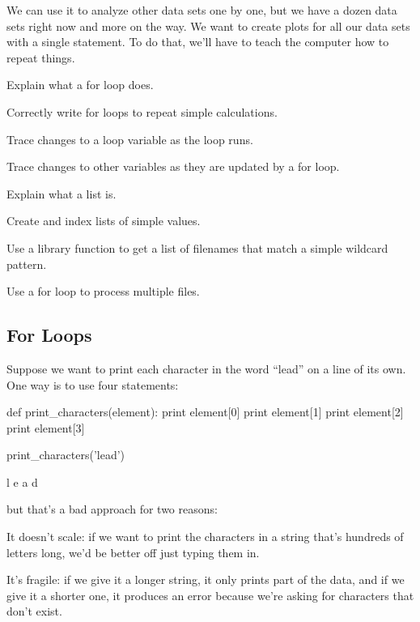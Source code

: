 We can use it to analyze other data sets one by one,
but we have a dozen data sets right now and more on the way. We want to
create plots for all our data sets with a single statement. To do that,
we'll have to teach the computer how to repeat things.

\begin{objectives}
\begin{swcitemize}
\item
  Explain what a for loop does.
\item
  Correctly write for loops to repeat simple calculations.
\item
  Trace changes to a loop variable as the loop runs.
\item
  Trace changes to other variables as they are updated by a for loop.
\item
  Explain what a list is.
\item
  Create and index lists of simple values.
\item
  Use a library function to get a list of filenames that match a simple
  wildcard pattern.
\item
  Use a for loop to process multiple files.
\end{swcitemize}
\end{objectives}

\subsection{For Loops}

Suppose we want to print each character in the word ``lead'' on a line
of its own. One way is to use four  statements:

\begin{VerbIn}
def print_characters(element):
    print element[0]
    print element[1]
    print element[2]
    print element[3]

print_characters('lead')
\end{VerbIn}

\begin{VerbOut}
l
e
a
d
\end{VerbOut}

but that's a bad approach for two reasons:

\begin{swcenumerate}
\item
  It doesn't scale: if we want to print the characters in a string
  that's hundreds of letters long, we'd be better off just typing them
  in.
\item
  It's fragile: if we give it a longer string, it only prints part of
  the data, and if we give it a shorter one, it produces an error
  because we're asking for characters that don't exist.
\end{swcenumerate}

